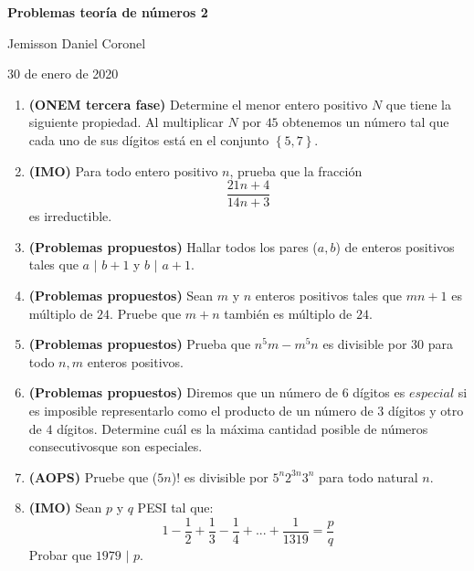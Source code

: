 \documentclass[10pt,a4 paper]{article}
\begin{document}
\chead{}

\begin{center}
\textbf{\Large{Problemas teor\'ia de n\'umeros 2}}
\end{center}

\begin{center}
Jemisson Daniel Coronel
\end{center}

\begin{center}
30 de enero de 2020
\end{center}
\vspace{9mm}
\begin{enumerate}

\item \textbf{(ONEM tercera fase)} Determine el menor entero positivo $N$ que tiene la siguiente propiedad. Al multiplicar $N$ por $45$ obtenemos un n\'umero tal que cada uno de sus d\'igitos est\'a en el conjunto $\left \{ 5, 7 \right \}$.  

\item \textbf{(IMO)} Para todo entero positivo $n$, prueba que la fracci\'on 
$$\frac{21n + 4}{14n + 3}$$
es irreductible.

\item \textbf{(Problemas propuestos)} Hallar todos los pares ($a, b$) de enteros positivos tales que $a$ $|$ $b + 1$ y $b$ $|$ $a + 1$.  

\item \textbf{(Problemas propuestos)} Sean $m$ y $n$ enteros positivos tales que $mn + 1$ es m\'ultiplo de $24$. Pruebe que $m + n$ tambi\'en es m\'ultiplo de $24$. 

\item \textbf{(Problemas propuestos)} Prueba que $n^{5}m - m^{5}n$ es divisible por $30$ para todo $n, m$ enteros positivos. 

\item \textbf{(Problemas propuestos)} Diremos que un n\'umero de $6$ d\'igitos es $especial$ si es imposible representarlo como el producto de un n\'umero de $3$ d\'igitos y otro de $4$ d\'igitos. Determine cu\'al es la m\'axima cantidad posible de n\'umeros consecutivosque son especiales. 

\item \textbf{(AOPS)} Pruebe que ($5n$)! es divisible por $5^{n}2^{3n}3^{n}$ para todo natural $n$.  

\item \textbf{(IMO)} Sean $p$ y $q$ PESI tal que:
$$1 - \frac{1}{2} + \frac{1}{3} - \frac{1}{4}+... + \frac{1}{1319} = \frac{p}{q}$$
Probar que $1979$ $|$ $p$.


\end{enumerate}
\end{document}
